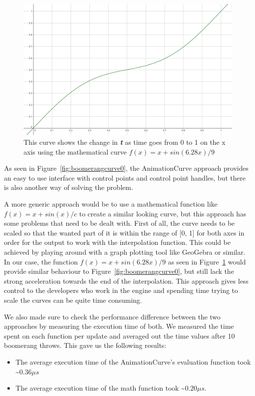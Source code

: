 \begin{figure}[tbph]
    \centering
    \includegraphics[width=.5\textwidth]{images/BoomerangMathematicalCurve}
    \caption[Boomerang curve using a mathematical formula]{This curve shows the change in \textbf{\textit{t}} as time goes from 0 to 1 on the x axis using the mathematical curve $f(x) = x + sin(6.28x) / 9$}
    \label{fig:boomerangcurve1}
\end{figure}
    

As seen in Figure~\ref{fig:boomerangcurve0}, the AnimationCurve approach provides an easy to use interface with control points and control point handles, but there is also another way of solving the problem. 

A more generic approach would be to use a mathematical function like $f(x) = x + sin(x) / c$ to create a similar looking curve, but this approach has some problems that need to be dealt with. First of all, the curve needs to be scaled so that the wanted part of it is within the range of [0, 1] for both axes in order for the output to work with the interpolation function. This could be achieved by playing around with a graph plotting tool like GeoGebra or similar. In our case, the function $f(x) = x + sin(6.28x) / 9$ as seen in Figure~\ref{fig:boomerangcurve1} would provide similar behaviour to Figure~\ref{fig:boomerangcurve0}, but still lack the strong acceleration towards the end of the interpolation. This approach gives less control to the developers who work in the engine and spending time trying to scale the curves can be quite time consuming.

We also made sure to check the performance difference between the two approaches by measuring the execution time of both. We measured the time spent on each function per update and averaged out the time values after 10 boomerang throws. This gave us the following results:

\begin{itemize}
    \item The average execution time of the AnimationCurve's evaluation function took \textasciitilde$ 0.36 \mu s$
    \item The average execution time of the math function took \textasciitilde$ 0.20 \mu s$.
\end{itemize}

